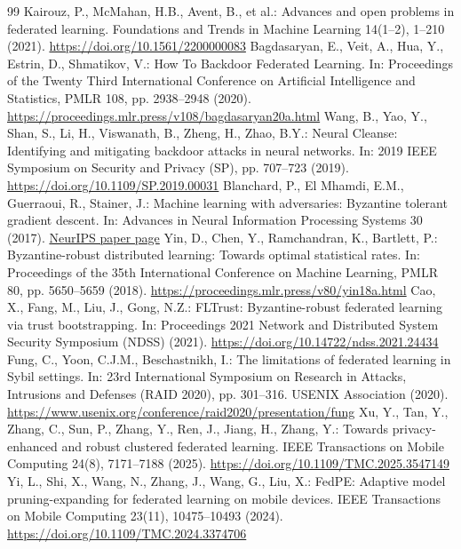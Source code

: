\documentclass[11pt, a4paper, UTF8, fontset=fandol]{ctexart}
\begin{document}
\begin{thebibliography}{99}
     Kairouz, P., McMahan, H.B., Avent, B., et al.: Advances and open problems in federated learning. Foundations and Trends in Machine Learning 14(1--2), 1--210 (2021). \url{https://doi.org/10.1561/2200000083}
     Bagdasaryan, E., Veit, A., Hua, Y., Estrin, D., Shmatikov, V.: How To Backdoor Federated Learning. In: Proceedings of the Twenty Third International Conference on Artificial Intelligence and Statistics, PMLR 108, pp. 2938--2948 (2020). \url{https://proceedings.mlr.press/v108/bagdasaryan20a.html}
     Wang, B., Yao, Y., Shan, S., Li, H., Viswanath, B., Zheng, H., Zhao, B.Y.: Neural Cleanse: Identifying and mitigating backdoor attacks in neural networks. In: 2019 IEEE Symposium on Security and Privacy (SP), pp. 707--723 (2019). \url{https://doi.org/10.1109/SP.2019.00031}
     Blanchard, P., El Mhamdi, E.M., Guerraoui, R., Stainer, J.: Machine learning with adversaries: Byzantine tolerant gradient descent. In: Advances in Neural Information Processing Systems 30 (2017). \href{https://papers.nips.cc/paper/6617-machine-learning-with-adversaries-byzantine-tolerant-gradient-descent}{NeurIPS paper page}
     Yin, D., Chen, Y., Ramchandran, K., Bartlett, P.: Byzantine-robust distributed learning: Towards optimal statistical rates. In: Proceedings of the 35th International Conference on Machine Learning, PMLR 80, pp. 5650--5659 (2018). \url{https://proceedings.mlr.press/v80/yin18a.html}
     Cao, X., Fang, M., Liu, J., Gong, N.Z.: FLTrust: Byzantine-robust federated learning via trust bootstrapping. In: Proceedings 2021 Network and Distributed System Security Symposium (NDSS) (2021). \url{https://doi.org/10.14722/ndss.2021.24434}
     Fung, C., Yoon, C.J.M., Beschastnikh, I.: The limitations of federated learning in Sybil settings. In: 23rd International Symposium on Research in Attacks, Intrusions and Defenses (RAID 2020), pp. 301--316. USENIX Association (2020). \url{https://www.usenix.org/conference/raid2020/presentation/fung}
     Xu, Y., Tan, Y., Zhang, C., Sun, P., Zhang, Y., Ren, J., Jiang, H., Zhang, Y.: Towards privacy-enhanced and robust clustered federated learning. IEEE Transactions on Mobile Computing 24(8), 7171--7188 (2025). \url{https://doi.org/10.1109/TMC.2025.3547149}
     Yi, L., Shi, X., Wang, N., Zhang, J., Wang, G., Liu, X.: FedPE: Adaptive model pruning-expanding for federated learning on mobile devices. IEEE Transactions on Mobile Computing 23(11), 10475--10493 (2024). \url{https://doi.org/10.1109/TMC.2024.3374706}

\end{thebibliography}
\end{document}
